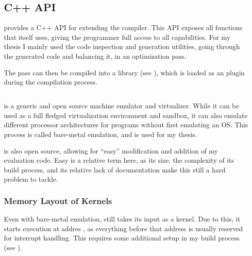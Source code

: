 


\subsection{\llvm{} C++ API}
\label{api}
\llvm{} provides a C++ API for extending the compiler.
This API exposes all functions that \llvm{} itself uses, giving the programmer full access to all capabilities.
For my thesis I mainly used the code inspection and generation utilities, going through the generated \ir{} code and balancing it, in an optimization pass.

The pass can then be compiled into a library (see ), which is loaded as an \llvm{} plugin during the compilation process.

\subsection{\qemu{}}
\label{qemu}
\qemu{} is a generic and open source machine emulator and virtualizer.\cite{bellard2005qemu}
While it can be used as a full fledged virtualization environment and sandbox, it can also emulate different processor architectures for programs without first emulating an OS.
This process is called bare-metal emulation, and is used for my thesis.

\qemu{} is also open source, allowing for ``easy'' modification and addition of my evaluation code.
Easy is a relative term here, as its size, the complexity of its build process, and its relative lack of documentation make this still a hard problem to tackle.

\subsubsection{Memory Layout of \qemu{} Kernels}
\label{memory}
Even with bare-metal emulation, \qemu{} still takes its input as a kernel.
Due to this, it starts execution at addres , as everything before that address is usually reserved for interrupt handling.
This requires some additional setup in my build process (see ).

